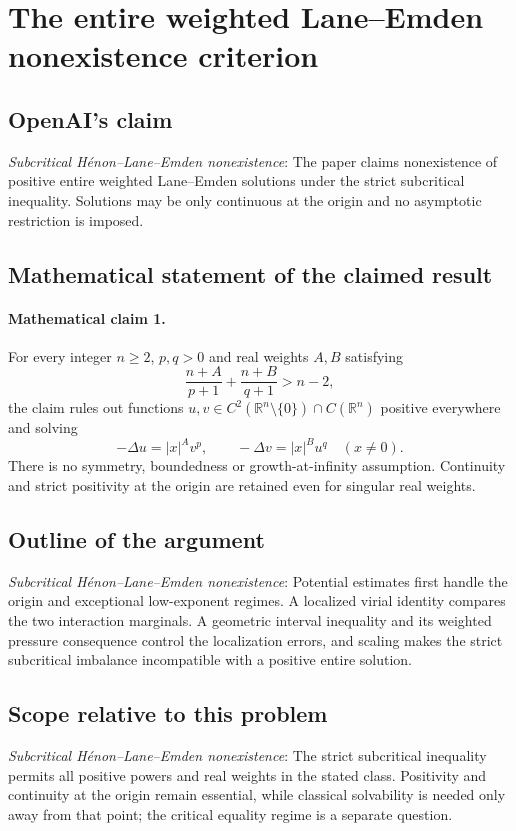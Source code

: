 \documentclass[11pt]{article}
\begin{document}
\section*{The entire weighted Lane–Emden nonexistence criterion}

\subsection{OpenAI's claim}
\textit{Subcritical Hénon--Lane--Emden nonexistence}: The paper claims nonexistence of positive entire weighted Lane--Emden solutions under the strict subcritical inequality. Solutions may be only continuous at the origin and no asymptotic restriction is imposed.

\subsection{Mathematical statement of the claimed result}
\paragraph{Mathematical claim 1.} For every integer $n\ge2$, $p,q>0$ and real weights $A,B$ satisfying \[\frac{n+A}{p+1}+\frac{n+B}{q+1}>n-2,\] the claim rules out functions $u,v\in C^2(\mathbb R^n\setminus\{0\})\cap C(\mathbb R^n)$ positive everywhere and solving \[-\Delta u=|x|^Av^p,\qquad-\Delta v=|x|^Bu^q\quad(x\ne0).\] There is no symmetry, boundedness or growth-at-infinity assumption. Continuity and strict positivity at the origin are retained even for singular real weights.

\subsection{Outline of the argument}
\textit{Subcritical Hénon--Lane--Emden nonexistence}: Potential estimates first handle the origin and exceptional low-exponent regimes. A localized virial identity compares the two interaction marginals. A geometric interval inequality and its weighted pressure consequence control the localization errors, and scaling makes the strict subcritical imbalance incompatible with a positive entire solution.

\subsection{Scope relative to this problem}
\textit{Subcritical Hénon--Lane--Emden nonexistence}: The strict subcritical inequality permits all positive powers and real weights in the stated class. Positivity and continuity at the origin remain essential, while classical solvability is needed only away from that point; the critical equality regime is a separate question.
\end{document}
